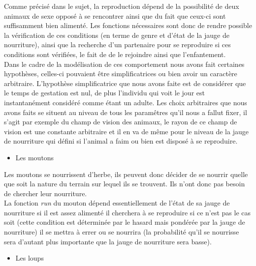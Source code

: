 \documentclass[12pt]{article}
\begin{document}
Comme précisé dans le sujet, la reproduction dépend de la possibilité de deux 
animaux de sexe opposé à se rencontrer ainsi que du fait que ceux-ci sont 
suffisamment bien alimenté. Les fonctions nécessaires sont donc de rendre 
possible la vérification de ces conditions (en terme de genre et d'état de la 
jauge de nourriture), ainsi que la recherche d'un partenaire pour se 
reproduire si ces conditions sont vérifiées, le fait de de le rejoindre ainsi 
que l'enfantement.\\

Dans le cadre de la modélisation de ces comportement nous avons fait certaines 
hypothèses, celles-ci pouvaient être simplificatrices ou bien avoir un 
caractère arbitraire. L'hypothèse simplificatrice que nous avons faite est de 
considérer que le temps de gestation est nul, de plus l'individu qui voit le 
jour est instantanément considéré comme étant un adulte. Les choix arbitraires 
que nous avons faits se situent au niveau de tous les paramêtres qu'il nous a 
fallut fixer, il s'agit par exemple du champ de vision des animaux, le rayon 
de ce champ de vision est une constante arbitraire et il en va de même pour 
le niveau de la jauge de nourriture qui défini si l'animal a faim ou bien est 
disposé à se reproduire.\\

		\begin{itemize}
		\item Les moutons\\
		\end{itemize}

Les moutons se nourrissent d'herbe, ils peuvent donc décider de se nourrir 
quelle que soit la nature du terrain sur lequel ils se trouvent. Ils n'ont 
donc pas besoin de chercher leur nourriture.\\

La fonction \textit{run} du mouton dépend essentiellement de l'état de sa 
jauge de nourriture si il est assez alimenté il cherchera à se reproduire 
si ce n'est pas le cas soit (cette condition est déterminée par le hasard mais 
pondérée par la jauge de nourriture) il se mettra à errer ou se nourrira (la 
probabilité qu'il se nourrisse sera d'autant plus importante que la jauge de 
nourriture sera basse).

		\begin{itemize}
		\item Les loups\\
		\end{itemize}
\end{document}
